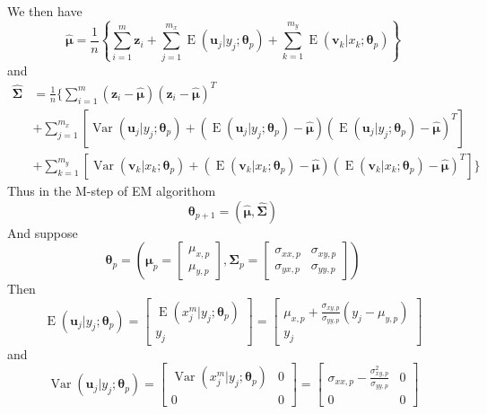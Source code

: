 \documentclass{article}
\DeclareMathOperator{\Var}{Var}
\DeclareMathOperator{\E}{E}
\begin{document}
\begin{enumerate}[font = \bfseries, leftmargin = 0 em]
	We then have
	\[\hat{\bm \mu} = \frac{1}{n}\left\{\sum_{i=1}^m \bm z_i + \sum_{j = 1}^{m_x}\E(\bm u_j|y_j; \bm \theta_p) + \sum_{k=1}^{m_y} \E(\bm v_k|x_k; \bm \theta_p)\right\}\]
	and
	\begin{align*}
	\hat{\bm \Sigma} &= \frac{1}{n}\bigg\{ \sum_{i=1}^m (\bm z_i - \hat{\bm \mu})(\bm z_i - \hat{\bm \mu})^T\\
		& + \sum_{j=1}^{m_x}\left[\Var(\bm u_j|y_j; \bm \theta_p) + \left(\E(\bm u_j|y_j; \bm \theta_p) - \hat{\bm \mu}\right)\left(\E(\bm u_j|y_j; \bm \theta_p) - \hat{\bm \mu}\right)^T\right]\\
		& + \sum_{k=1}^{m_y}\left[\Var(\bm v_k|x_k; \bm \theta_p) + \left(\E(\bm v_k|x_k; \bm \theta_p) - \hat{\bm \mu}\right)\left(\E(\bm v_k|x_k; \bm \theta_p) - \hat{\bm \mu}\right)^T\right]\bigg\}\end{align*}
		Thus in the M-step of EM algorithom
		\[\bm \theta_{p+1} = (\hat{\bm \mu}, \hat{\bm \Sigma})\]
		And suppose 
		\[\bm \theta_p = \left(\bm \mu_p = \begin{bmatrix}
			\mu_{x,p}\\
			\mu_{y,p}
		\end{bmatrix}, \bm \Sigma_p = \begin{bmatrix}
			\sigma_{xx, p} & \sigma_{xy, p}\\
			\sigma_{yx, p} & \sigma_{yy, p}
		\end{bmatrix}\right)\]
		Then
		\[\E(\bm u_j|y_j; \bm \theta_p) = \begin{bmatrix}
			\E(x_j^m| y_j; \bm \theta_p)\\
			y_j
		\end{bmatrix} = \begin{bmatrix}
			\mu_{x,p} + \frac{\sigma_{xy,p}}{\sigma_{yy, p}}(y_j - \mu_{y,p})\\
			y_j
		\end{bmatrix}\]
		and
		\[\Var(\bm u_j|y_j; \bm \theta_p) = \begin{bmatrix}
			\Var(x_j^m|y_j;\bm \theta_p) & 0\\
			0&0
		\end{bmatrix} = \begin{bmatrix}
			\sigma_{xx,p} - \frac{\sigma_{xy,p}^2}{\sigma_{yy,p}} & 0\\
			0 & 0
		\end{bmatrix}\]


\end{enumerate}
\end{document}
